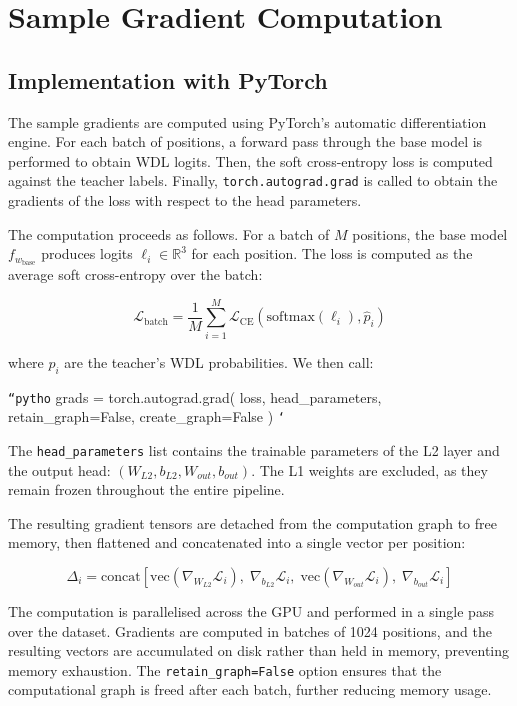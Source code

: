 \section{Sample Gradient Computation}


\subsection{Implementation with PyTorch}

The sample gradients are computed using PyTorch's automatic differentiation engine. For each batch of positions, a forward pass through the base model is performed to obtain WDL logits. Then, the soft cross-entropy loss is computed against the teacher labels. Finally, \texttt{torch.autograd.grad} is called to obtain the gradients of the loss with respect to the head parameters.

The computation proceeds as follows. For a batch of $M$ positions, the base model $f_{w_{\text{base}}}$ produces logits $\ell_i \in \mathbb{R}^3$ for each position. The loss is computed as the average soft cross-entropy over the batch:

\[\mathcal{L}_{\text{batch}} = \frac{1}{M} \sum_{i=1}^M \mathcal{L}_{\text{CE}}(\text{softmax}(\ell_i), \hat{p}_i)\]

where $\hat{p}_i$ are the teacher's WDL probabilities. We then call:

\texttt{``pytho}
grads = torch.autograd.grad(
loss,
head\_parameters,
retain\_graph=False,
create\_graph=False
)
\texttt{`}

The \texttt{head\_parameters} list contains the trainable parameters of the L2 layer and the output head: $(W_{L2}, b_{L2}, W_{out}, b_{out})$. The L1 weights are excluded, as they remain frozen throughout the entire pipeline.


The resulting gradient tensors are detached from the computation graph to free memory, then flattened and concatenated into a single vector per position:

\[\Delta_i = \text{concat}\left[\text{vec}(\nabla_{W_{L2}} \mathcal{L}_i),\; \nabla_{b_{L2}} \mathcal{L}_i,\; \text{vec}(\nabla_{W_{out}} \mathcal{L}_i),\; \nabla_{b_{out}} \mathcal{L}_i\right]\]

The computation is parallelised across the GPU and performed in a single pass over the dataset. Gradients are computed in batches of 1024 positions, and the resulting vectors are accumulated on disk rather than held in memory, preventing memory exhaustion. The \texttt{retain\_graph=False} option ensures that the computational graph is freed after each batch, further reducing memory usage.


